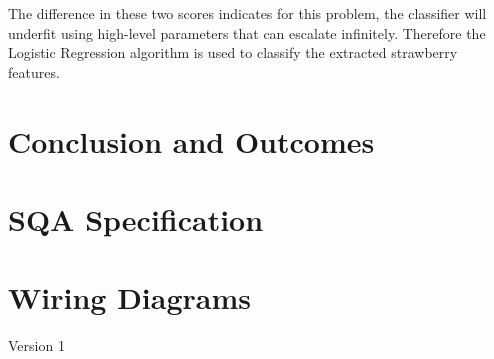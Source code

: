 \documentclass[fleqn,twoside]{article}
\begin{document}
The difference in these two scores indicates for this problem, the classifier will underfit using high-level parameters that can escalate infinitely. Therefore the Logistic Regression algorithm is used to classify the extracted strawberry features. 









\newpage

\section{Conclusion and Outcomes}
















\newpage





\newpage
\appendix
\section{SQA Specification}
\label{app:sqa_specs}


\begin{minipage}[b]{0.9\linewidth}
	
\end{minipage}




\newpage

\section{Wiring Diagrams}
\label{app:wiring}

Version 1
\begin{minipage}[b]{0.9\linewidth}
	
\end{minipage}
\end{document}
